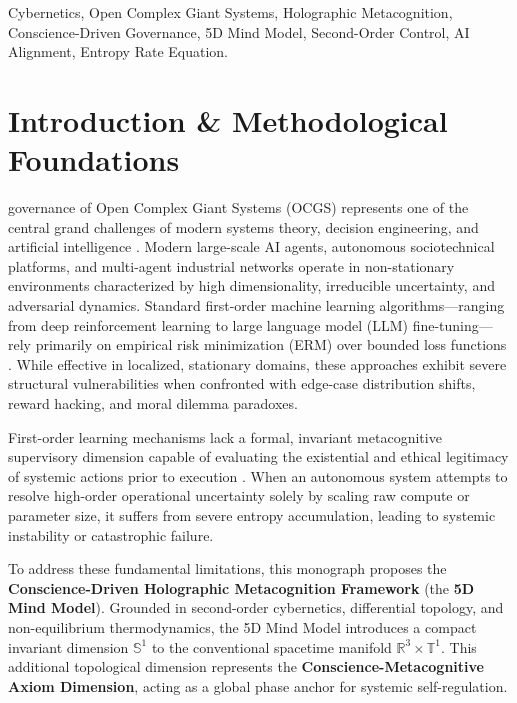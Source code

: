 \documentclass[journal,twocolumn,10pt]{IEEEtran}
\begin{document}
\begin{IEEEkeywords}
Cybernetics, Open Complex Giant Systems, Holographic Metacognition, Conscience-Driven Governance, 5D Mind Model, Second-Order Control, AI Alignment, Entropy Rate Equation.
\end{IEEEkeywords}

\section{Introduction \& Methodological Foundations}
 governance of Open Complex Giant Systems (OCGS) represents one of the central grand challenges of modern systems theory, decision engineering, and artificial intelligence \cite{qian1990open, wu1990pansystems, ashby1956introduction, wiener1948cybernetics}. Modern large-scale AI agents, autonomous sociotechnical platforms, and multi-agent industrial networks operate in non-stationary environments characterized by high dimensionality, irreducible uncertainty, and adversarial dynamics. Standard first-order machine learning algorithms---ranging from deep reinforcement learning to large language model (LLM) fine-tuning---rely primarily on empirical risk minimization (ERM) over bounded loss functions \cite{cao2014non}. While effective in localized, stationary domains, these approaches exhibit severe structural vulnerabilities when confronted with edge-case distribution shifts, reward hacking, and moral dilemma paradoxes.

First-order learning mechanisms lack a formal, invariant metacognitive supervisory dimension capable of evaluating the existential and ethical legitimacy of systemic actions prior to execution \cite{damasio1994descartes}. When an autonomous system attempts to resolve high-order operational uncertainty solely by scaling raw compute or parameter size, it suffers from severe entropy accumulation, leading to systemic instability or catastrophic failure.

To address these fundamental limitations, this monograph proposes the \textbf{Conscience-Driven Holographic Metacognition Framework} (the \textbf{5D Mind Model}). Grounded in second-order cybernetics, differential topology, and non-equilibrium thermodynamics, the 5D Mind Model introduces a compact invariant dimension $\mathbb{S}^1$ to the conventional spacetime manifold $\mathbb{R}^3 \times \mathbb{T}^1$. This additional topological dimension represents the \textbf{Conscience-Metacognitive Axiom Dimension}, acting as a global phase anchor for systemic self-regulation.
\end{document}
